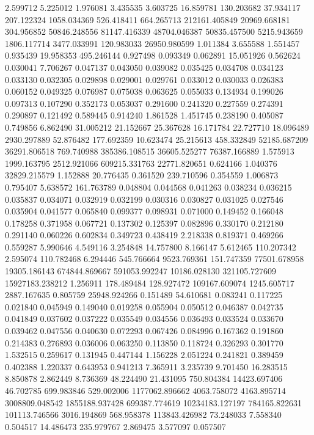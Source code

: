2.599712
5.225012
1.976081
3.435535
3.603725
16.859781
130.203682
37.934117
207.122324
1058.034369
526.418411
664.265713
212161.405849
20969.668181
304.956852
50846.248556
81147.416339
48704.046387
50835.457500
5215.943659
1806.117714
3477.033991
120.983033
26950.980599
1.011384
3.655588
1.551457
0.935439
19.958353
495.246144
0.927498
0.093349
0.062891
15.051926
0.562624
0.030041
7.706267
0.047137
0.043050
0.039082
0.035425
0.034708
0.034123
0.033130
0.032305
0.029898
0.029001
0.029761
0.033012
0.030033
0.026383
0.060152
0.049325
0.076987
0.075038
0.063625
0.055033
0.134934
0.199026
0.097313
0.107290
0.352173
0.053037
0.291600
0.241320
0.227559
0.274391
0.290897
0.121492
0.589445
0.914240
1.861528
1.451745
0.238190
0.405087
0.749856
6.862490
31.005212
21.152667
25.367628
16.171784
22.727710
18.096489
2930.297889
52.876482
177.692359
10.623474
25.215613
458.332849
52185.687209
36291.806518
769.740988
385386.108515
36605.525277
76387.166889
1.575913
1999.163795
2512.921066
609215.331763
22771.820651
0.624166
1.040376
32829.215579
1.152888
20.776435
0.361520
239.710596
0.354559
1.006873
0.795407
5.638572
161.763789
0.048804
0.044568
0.041263
0.038234
0.036215
0.035837
0.034071
0.032919
0.032199
0.030316
0.030827
0.031025
0.027546
0.035904
0.041577
0.065840
0.099377
0.098931
0.071000
0.149452
0.166048
0.178258
0.371958
0.067721
0.137302
0.125397
0.082896
0.330170
0.212180
0.291140
0.060226
0.602834
0.349723
0.438419
2.218338
0.819371
0.469266
0.559287
5.990646
4.549116
3.254848
14.757800
8.166147
5.612465
110.207342
2.595074
110.782468
6.294446
545.766664
9523.769361
151.747359
77501.678958
19305.186143
674844.869667
591053.992247
10186.028130
321105.727609
15927183.238212
1.256911
178.489484
128.927472
109167.609074
1245.605717
2887.167635
0.805759
25948.924266
0.151489
54.610681
0.083241
0.117225
0.021840
0.045949
0.149040
0.019258
0.055904
0.050512
0.046387
0.042735
0.041849
0.037602
0.037222
0.035549
0.034556
0.036493
0.033524
0.033670
0.039462
0.047556
0.040630
0.072293
0.067426
0.084996
0.167362
0.191860
0.214383
0.276893
0.036006
0.063250
0.113850
0.118724
0.326293
0.301770
1.532515
0.259617
0.131945
0.447144
1.156228
2.051224
0.241821
0.389459
0.402388
1.220337
0.643953
0.941213
7.365911
3.235739
9.701450
16.283515
8.850878
2.862449
8.736369
48.224490
21.431095
750.804384
14423.697406
46.702785
699.983846
529.002006
1177062.896662
4063.758072
4163.895714
3008809.048542
1855188.937428
699387.774619
10234183.127197
784165.822631
101113.746566
3016.194869
568.958378
113843.426982
73.248033
7.558340
0.504517
14.486473
235.979767
2.869475
3.577097
0.057507
